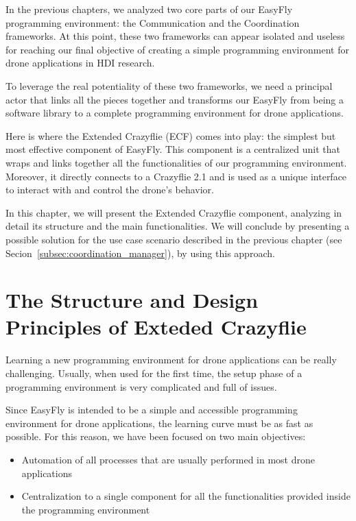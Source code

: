 In the previous chapters, we analyzed two core parts of our EasyFly programming environment: the Communication and the Coordination frameworks.
At this point, these two frameworks can appear isolated and useless for reaching our final objective of creating a simple programming environment for drone applications in HDI research.

To leverage the real potentiality of these two frameworks, we need a principal actor that links all the pieces together and transforms our EasyFly from being a software library to a complete programming environment for drone applications.

Here is where the Extended Crazyflie (ECF) comes into play: the simplest but most effective component of EasyFly. 
This component is a centralized unit that wraps and links together all the functionalities of our programming environment. 
Moreover, it directly connects to a Crazyflie 2.1 and is used as a unique interface to interact with and control the drone's behavior.

In this chapter, we will present the Extended Crazyflie component, analyzing in detail its structure and the main functionalities. 
We will conclude by presenting a possible solution for the use case scenario described in the previous chapter (see Secion~\ref{subsec:coordination_manager}),
by using this approach.


\section{The Structure and Design Principles of Exteded Crazyflie}\label{sec:ecf_structure_design}

Learning a new programming environment for drone applications can be really challenging. 
Usually, when used for the first time, the setup phase of a programming environment is very complicated and full of issues. 

Since EasyFly is intended to be a simple and accessible programming environment for drone applications, the learning curve must be as fast as possible.
For this reason, we have been focused on two main objectives:
\begin{itemize}
    \item Automation of all processes that are usually performed in most drone applications
    \item Centralization to a single component for all the functionalities provided inside the programming environment
\end{itemize}

